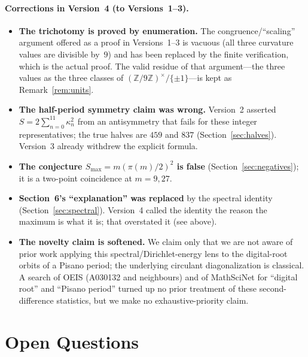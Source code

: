 \documentclass[12pt]{article}
\theoremstyle{remark}
\begin{document}
\paragraph{Corrections in Version~4 (to Versions~1--3).}
\begin{itemize}
\item \textbf{The trichotomy is proved by enumeration.} The congruence/``scaling''
argument offered as a proof in Versions~1--3 is vacuous (all three curvature values are
divisible by~$9$) and has been replaced by the finite verification, which is the actual
proof. The valid residue of that argument---the three values as the three classes of
$(\mathbb Z/9\mathbb Z)^\times/\{\pm1\}$---is kept as Remark~\ref{rem:units}.
\item \textbf{The half-period symmetry claim was wrong.} Version~2 asserted
$S=2\sum_{n=0}^{11}\kappa_n^2$ from an antisymmetry that fails for these integer
representatives; the true halves are $459$ and $837$ (Section~\ref{sec:halves}).
Version~3 already withdrew the explicit formula.
\item \textbf{The conjecture $S_{\max}=m(\pi(m)/2)^2$ is false}
(Section~\ref{sec:negatives}); it is a two-point coincidence at $m=9,27$.
\item \textbf{Section~6's ``explanation'' was replaced} by the spectral identity
(Section~\ref{sec:spectral}). Version~4 called the identity the reason the maximum is what
it is; that overstated it (see above).
\item \textbf{The novelty claim is softened.} We claim only that we are not aware of prior
work applying this spectral/Dirichlet-energy lens to the digital-root orbits of a Pisano
period; the underlying circulant diagonalization is classical. A search of OEIS
(A030132 and neighbours) and of MathSciNet for ``digital root'' and ``Pisano period''
turned up no prior treatment of these second-difference statistics, but we make no
exhaustive-priority claim.
\end{itemize}

\section{Open Questions}\label{sec:open}
\end{document}
